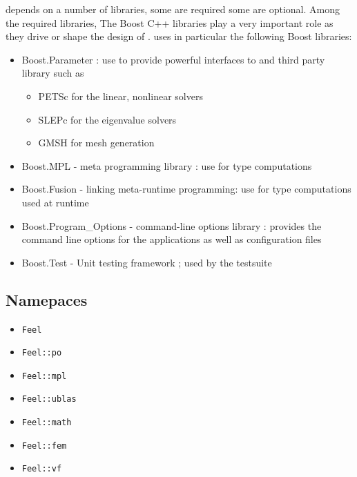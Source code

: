 \feel depends on a number of libraries, some are required some are optional.
Among the required libraries, The Boost C++ libraries play a very important role
as they drive or shape the  design of \feel. \feel uses in particular the
following Boost libraries:
\begin{itemize}
\item Boost.Parameter : use to provide powerful
  interfaces to \feel and third party library such as
  \begin{itemize}
  \item PETSc  for the linear, nonlinear solvers
  \item SLEPc for the eigenvalue solvers
  \item GMSH for mesh generation
  \end{itemize}
\item Boost.MPL - meta programming library : use for type computations
\item Boost.Fusion - linking meta-runtime programming: use for type computations
  used at runtime
\item Boost.Program\_Options - command-line options library : provides the
  command line options for the \feel applications as well as configuration files
\item Boost.Test - Unit testing framework ; used by the \feel testsuite
\end{itemize}

\subsection{\feel Namepaces}

\begin{itemize}
\item \lstinline!Feel!
\item \lstinline!Feel::po!
\item \lstinline!Feel::mpl!
\item \lstinline!Feel::ublas!
\item \lstinline!Feel::math!
\item \lstinline!Feel::fem!
\item \lstinline!Feel::vf!

\end{itemize}

